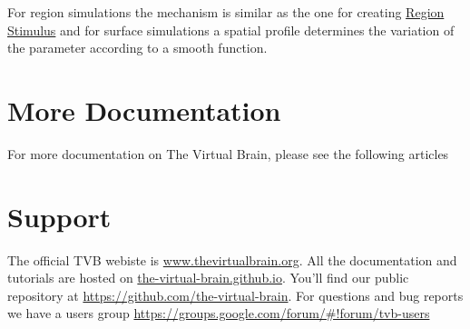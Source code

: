 \documentclass{tufte-handout}
\begin{document}
For region simulations the mechanism is similar as the one for creating \underline{Region
Stimulus} and for surface simulations a spatial profile determines the
variation of the parameter according to a smooth function.


\section{More Documentation}\label{sec:more-doc}
For more documentation on The Virtual Brain, please see the following articles \cite{Sanz-Leon_2013, Spiegler_2013, Woodman_2014, Jirsa_2010b}


\section{Support}\label{sec:support}

The official TVB webiste is \url{www.thevirtualbrain.org}.  
All the documentation and tutorials are hosted on \url{the-virtual-brain.github.io}.
You'll find our public  repository at \url{https://github.com/the-virtual-brain}. 
For questions and bug reports we have a users group \url{https://groups.google.com/forum/#!forum/tvb-users}



\end{document}

